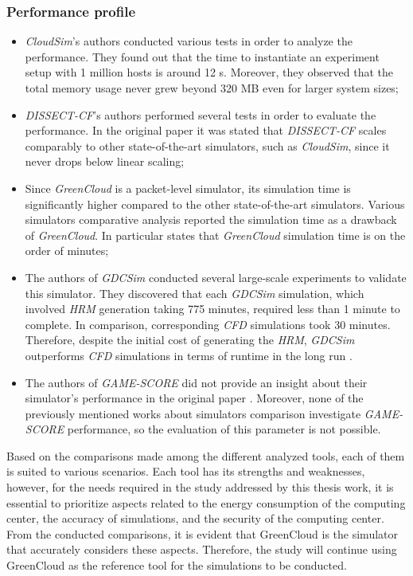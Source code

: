 {\subsubsection{Performance profile}
\begin{itemize}
    \item \emph{CloudSim}'s authors conducted various tests in order to analyze the performance. They found out that the time to instantiate an experiment setup with 1 million hosts is around 12 s. Moreover, they observed that the total memory usage never grew beyond 320 MB even for larger system sizes;
    \item \emph{DISSECT-CF}'s authors performed several tests in order to evaluate the performance. In the original paper it was stated that \emph{DISSECT-CF} scales comparably to other state-of-the-art simulators, such as \emph{CloudSim}, since it never drops below linear scaling;
    \item Since \emph{GreenCloud} is a packet-level simulator, its simulation time is significantly higher compared to the other state-of-the-art simulators. Various simulators comparative analysis reported the simulation time as a drawback of \emph{GreenCloud}. In particular \cite{khalil2017cloud} states that \emph{GreenCloud} simulation time is on the order of minutes;
    \item The authors of \emph{GDCSim} conducted several large-scale experiments to validate this simulator. They discovered that each \emph{GDCSim} simulation, which involved \emph{HRM} generation taking 775 minutes, required less than 1 minute to complete. In comparison, corresponding \emph{CFD} simulations took 30 minutes. Therefore, despite the initial cost of generating the \emph{HRM}, \emph{GDCSim} outperforms \emph{CFD} simulations in terms of runtime in the long run \cite{gupta2014gdcsim}.
    \item The authors of \emph{GAME-SCORE} did not provide an insight about their simulator's performance in the original paper \cite{fernandez2019game}. Moreover, none of the previously mentioned works about simulators comparison investigate \emph{GAME-SCORE} performance, so the evaluation of this parameter is not possible. 
\end{itemize}

Based on the comparisons made among the different analyzed tools, each of them is suited to various scenarios. Each tool has its strengths and weaknesses, however, for the needs required in the study addressed by this thesis work, it is essential to prioritize aspects related to the energy consumption of the computing center, the accuracy of simulations, and the security of the computing center. From the conducted comparisons, it is evident that GreenCloud is the simulator that accurately considers these aspects. Therefore, the study will continue using GreenCloud as the reference tool for the simulations to be conducted.


}

